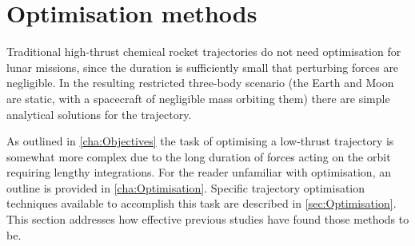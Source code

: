 
\section{Optimisation methods} \label{sec:Optimisation-methods}
Traditional high-thrust chemical rocket trajectories do not need optimisation for lunar missions, since the duration is sufficiently small that perturbing forces are negligible. In the resulting restricted three-body scenario (the Earth and Moon are static, with a spacecraft of negligible mass orbiting them) there are simple analytical solutions for the trajectory.

As outlined in \autoref{cha:Objectives} the task of optimising a low-thrust trajectory is somewhat more complex due to the long duration of forces acting on the orbit requiring lengthy integrations. For the reader unfamiliar with optimisation, an outline is provided in \autoref{cha:Optimisation}. Specific trajectory optimisation techniques available to accomplish this task are described in \autoref{sec:Optimisation}. This section addresses how effective previous studies have found those methods to be.

